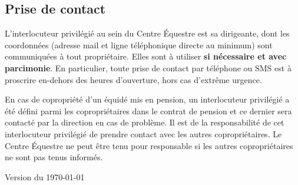 \documentclass[11pt,a4paper]{article}
\begin{document}
\subsection*{Prise de contact}
	L'interlocuteur privilégié au sein du Centre Équestre est sa dirigeante, dont les coordonnées (adresse mail et ligne téléphonique directe au minimum) sont communiquées à tout propriétaire. Elles sont à utiliser \textbf{si nécessaire et avec parcimonie}. En particulier, toute prise de contact par téléphone ou SMS est à proscrire en-dehors des heures d'ouverture, hors cas d'extrême urgence.

	En cas de copropriété d'un équidé mis en pension, un interlocuteur privilégié a été défini parmi les copropriétaires dans le contrat de pension et ce dernier sera contacté par la direction en cas de problème. Il est de la responsabilité de cet interlocuteur privilégié de prendre contact avec les autres copropriétaires. Le Centre Équestre ne peut être tenu pour responsable si les autres copropriétaires ne sont pas tenus informés.

\vfill
\begin{flushright}
	Version du \today
\end{flushright}
\end{document}
